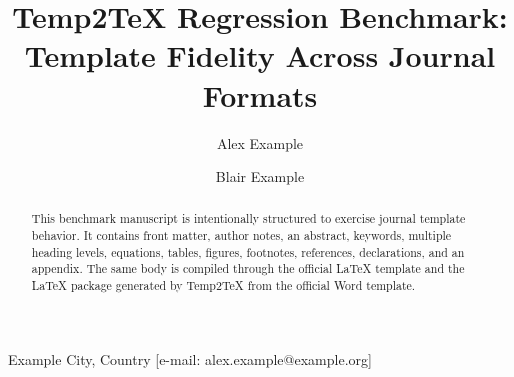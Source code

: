 \title{Temp2TeX Regression Benchmark: Template Fidelity Across Journal Formats}
\author[1*]{Alex Example}
\author[1]{Blair Example}
              {Example City, Country}
              {[e-mail: alex.example@example.org]}
\date{}
\maketitle
{}
\begin{abstract}
This benchmark manuscript is intentionally structured to exercise journal template behavior. It contains front matter, author notes, an abstract, keywords, multiple heading levels, equations, tables, figures, footnotes, references, declarations, and an appendix. The same body is compiled through the official LaTeX template and the LaTeX package generated by Temp2TeX from the official Word template.
\end{abstract}
\providecommand{\tempTwoTexPairedFigure}{%
\begin{figure}[htbp]
\centering
\subfloat[Panel A]{\fbox{\rule{0pt}{25mm}\rule{0.38\linewidth}{0pt}}}\hfill
\subfloat[Panel B]{\fbox{\rule{0pt}{25mm}\rule{0.38\linewidth}{0pt}}}
\caption{Two-panel figure placeholder used for subfigure regression}
\label{fig:paired}
\end{figure}%
}
